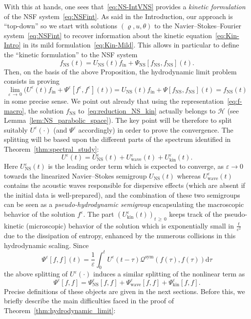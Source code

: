 \documentclass[10pt]{amsart}
\theoremstyle{definition}\newtheorem{defi}[theo]{Definition}\newtheorem{rema}[theo]{Remark}\newtheorem{exam}[theo]{Example}\newtheorem{exem}[theo]{Example}\newtheorem{nota}[theo]{Notation}
\newcommand{\ini}{\mathrm{in}}
\newcommand{\ns}{\mathrm{NS}}
\newcommand{\kin}{\mathrm{kin}}
\newcommand{\sym}{\mathrm{sym}}
\renewcommand{\d}{\mathrm{d}}
\newcommand{\Wave}{\mathrm{wave}}
\newcommand{\QQ}{\mathcal{Q}}
\newcommand{\HHH}{\mathscr{H}}
\newcommand{\SSSs}{\HHH}
\renewcommand*\ge{\geqslant}
\newcommand*\eps{{\varepsilon}}
\begin{document}
With this at hands, one sees that~\eqref{eq:NS-IntVNS} provides a \emph{kinetic formulation} of the NSF system~\eqref{eq:NSFint}. As said in the Introduction, our approach is ``top-down'' so we start with solutions $(\varrho,u,\theta)$ to the Navier--Stokes--Fourier system~\eqref{eq:NSFint} to recover information about the kinetic equation~\eqref{eq:Kin-Intro} in its mild formulation~\eqref{eq:Kin-Mild}. This allows in particular to define the ``kinetic formulation'' to the NSF system
\begin{equation}\label{eq:reduction_NS_kin}
f_\ns(t)=U_\ns(t)f_\ini + \Psi_\ns\left[f_\ns,f_\ns\right](t).
\end{equation}
Then, on the basis of the above Proposition, the hydrodynamic limit problem consists in proving
\[
\lim_{\eps\,\to\,0}\Big(U^\eps(t) f_\ini + \Psi^\eps\left[f^\eps, f^\eps \right](t) \Big)= U_\ns(t) f_\ini + \Psi[f_\ns, f_\ns](t) = f_\ns(t)
\]
in some precise sense. We point out already that using the representation~\eqref{eq:f-macro}, the solution $f_\ns$ to~\eqref{eq:reduction_NS_kin} actually belongs to $\SSSs$ (see Lemma~\ref{lem:NS_parabolic_space}).\color{black} The key point will be therefore to split suitably $U^\eps(\cdot)$ (and $\Psi^\eps$ accordingly) in order to prove the convergence. The splitting will be based upon the different parts of the spectrum identified in Theorem~\ref{thm:spectral_study}:
\[
U^\eps(t)=U^\eps_\ns(t)+U^\eps_\Wave(t)+U^\eps_\kin(t).
\]
Here $U^\eps_\ns(t)$ is the leading order term which is expected to converge, as $\eps\to0$ towards the linearized Navier--Stokes semigroup $U_\ns(t)$ whereas $U^\eps_\Wave(t)$ contains the acoustic waves {responsible for dispersive effects (which are absent if the initial data is well-prepared)}, and the combination of these two semigroups can be seen as a \emph{pseudo-hydrodynamic semigroup} encapsulating the macroscopic behavior of the solution $f^\eps$. The part $(U^\eps_\kin(t))_{t\,\ge\,0}$ keeps track of the {pseudo-}kinetic (microscopic) behavior of the solution which is exponentially small in $\frac{t}{\eps^2}$ due to the dissipation of entropy, enhanced by the numerous collisions in this hydrodynamic scaling. Since
\[
\Psi^\eps[f,f](t)=\frac{1}{\eps}\int_0^t U^\eps(t-\tau)\QQ^{\sym}(f(\tau),f(\tau))\d\tau
\]
the above splitting of $U^\eps(\cdot)$ induces a similar splitting of the nonlinear term as
\[
\Psi^\eps[f,f]=\Psi^\eps_\ns[f,f]+\Psi^\eps_\Wave[f,f]+\Psi^\eps_\kin[f,f].
\]
Precise definitions of these objects are given in the next sections. Before this, we briefly describe the main difficulties faced in the proof of Theorem~\ref{thm:hydrodynamic_limit}:
\end{document}
